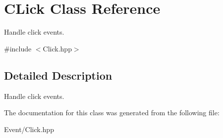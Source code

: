 \hypertarget{class_c_lick}{}\section{C\+Lick Class Reference}
\label{class_c_lick}


Handle click events.  




{\ttfamily \#include $<$Click.\+hpp$>$}



\subsection{Detailed Description}
Handle click events. 

The documentation for this class was generated from the following file\+:\begin{DoxyCompactItemize}
\item 
Event/Click.\+hpp\end{DoxyCompactItemize}
